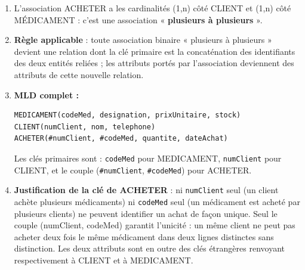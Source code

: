 \documentclass[11pt]{article}
\begin{document}
\begin{corrige}
\begin{enumerate}
  \item L'association ACHETER a les cardinalités (1,n) côté CLIENT et (1,n) côté MÉDICAMENT : c'est une association « \textbf{plusieurs à plusieurs} ».
  \item \textbf{Règle applicable} : toute association binaire « plusieurs à plusieurs » devient une relation dont la clé primaire est la concaténation des identifiants des deux entités reliées ; les attributs portés par l'association deviennent des attributs de cette nouvelle relation.
  \item \textbf{MLD complet :}
\begin{lstlisting}
MEDICAMENT(codeMed, designation, prixUnitaire, stock)
CLIENT(numClient, nom, telephone)
ACHETER(#numClient, #codeMed, quantite, dateAchat)
\end{lstlisting}
  Les clés primaires sont : \texttt{codeMed} pour MEDICAMENT, \texttt{numClient} pour CLIENT, et le couple (\texttt{\#numClient}, \texttt{\#codeMed}) pour ACHETER.
  \item \textbf{Justification de la clé de ACHETER} : ni \texttt{numClient} seul (un client achète plusieurs médicaments) ni \texttt{codeMed} seul (un médicament est acheté par plusieurs clients) ne peuvent identifier un achat de façon unique. Seul le couple (numClient, codeMed) garantit l'unicité : un même client ne peut pas acheter deux fois le même médicament dans deux lignes distinctes sans distinction. Les deux attributs sont en outre des clés étrangères renvoyant respectivement à CLIENT et à MEDICAMENT.
\end{enumerate}
\end{corrige}
\end{document}
